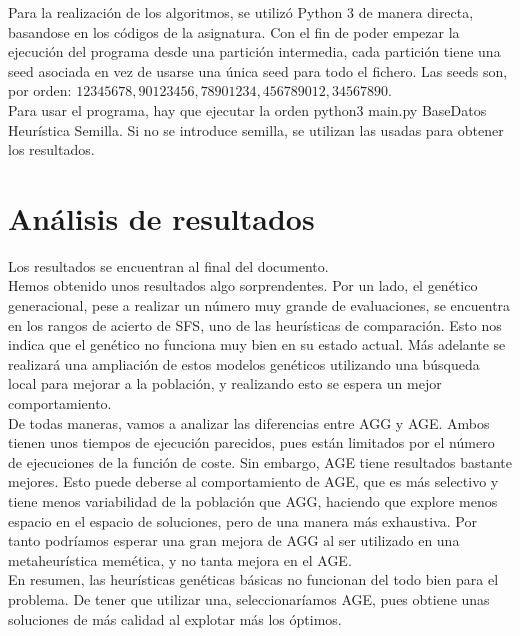 Para la realización de los algoritmos, se utilizó Python 3 de manera directa, basandose en los códigos de la asignatura. Con el fin de poder empezar la ejecución del programa desde una partición intermedia, cada partición tiene una seed asociada en vez de usarse una única seed para todo el fichero. Las seeds son, por orden: $12345678,90123456,78901234,456789012,34567890$. \\

Para usar el programa, hay que ejecutar la orden  python3 main.py BaseDatos Heurística Semilla. Si no se introduce semilla, se utilizan las usadas para obtener los resultados.
\newpage
\section{Análisis de resultados}

Los resultados se encuentran al final del documento.\\

Hemos obtenido unos resultados algo sorprendentes. Por un lado, el genético generacional, pese a realizar un número muy grande de evaluaciones, se encuentra en los rangos de acierto de SFS, uno de las heurísticas de comparación. Esto nos indica que el genético no funciona muy bien en su estado actual. Más adelante se realizará una ampliación de estos modelos genéticos utilizando una búsqueda local para mejorar a la población, y realizando esto se espera un mejor comportamiento.\\

De todas maneras, vamos a analizar las diferencias entre AGG y AGE. Ambos tienen unos tiempos de ejecución parecidos, pues están limitados por el número de ejecuciones de la función de coste. Sin embargo, AGE tiene resultados bastante mejores. Esto puede deberse al comportamiento de AGE, que es más selectivo y tiene menos variabilidad de la población que AGG, haciendo que explore menos espacio en el espacio de soluciones, pero de una manera más exhaustiva. Por tanto podríamos esperar una gran mejora de AGG al ser utilizado en una metaheurística memética, y no tanta mejora en el AGE.\\

En resumen, las heurísticas genéticas básicas no funcionan del todo bien para el problema. De tener que utilizar una, seleccionaríamos AGE, pues obtiene unas soluciones de más calidad al explotar más los óptimos.\\

\newpage
